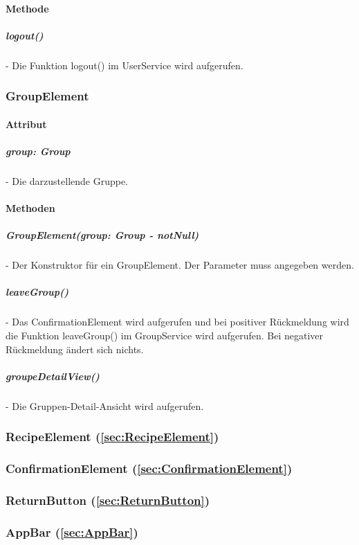 \documentclass[parskip=full]{scrartcl}
\begin{document}
        \paragraph*{Methode}
            \subparagraph*{logout()} - Die Funktion logout() im UserService wird aufgerufen.
            
    \subsubsection*{GroupElement}
        \paragraph*{Attribut}
            \subparagraph*{group: Group} - Die darzustellende Gruppe.

        \paragraph*{Methoden}
            \subparagraph*{GroupElement(group: Group - notNull)} - Der Konstruktor für ein GroupElement. Der Parameter muss angegeben werden.
            \subparagraph*{leaveGroup()} - Das ConfirmationElement wird aufgerufen und bei positiver Rückmeldung wird die Funktion leaveGroup() im GroupService wird aufgerufen. Bei negativer Rückmeldung ändert sich nichts.
            \subparagraph*{groupeDetailView()} - Die Gruppen-Detail-Ansicht wird aufgerufen.
    
    \subsubsection*{RecipeElement (\autoref{sec:RecipeElement})}

    \subsubsection*{ConfirmationElement (\autoref{sec:ConfirmationElement})}

    \subsubsection*{ReturnButton (\autoref{sec:ReturnButton})}

    \subsubsection*{AppBar (\autoref{sec:AppBar})}
            
\end{document}
